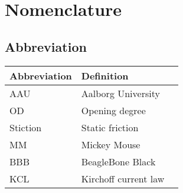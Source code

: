 \chapter*{Nomenclature}\label{ch:nomenclature}
\section*{Abbreviation}
\begin{longtable}[H]{p{80pt} p{300pt} p{40pt}}
\textbf{Abbreviation}	& \textbf{Definition} & \textbf{ } \\ \hline
AAU	  & Aalborg University    		&\\
OD 		& Opening degree 					&\\
Stiction 		& Static friction 					&\\
MM 		& Mickey Mouse 					&\\
BBB 		& BeagleBone Black					&\\
KCL 		& Kirchoff current law					&\\
\end{longtable}

